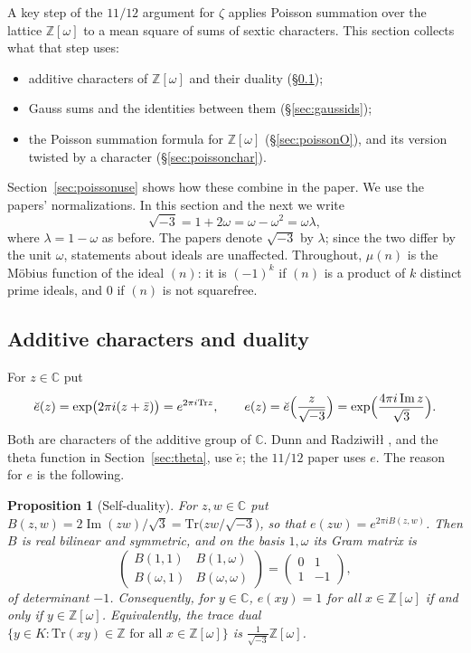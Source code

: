 \documentclass[11pt]{article}
\numberwithin{equation}{section}
\newcommand{\Tr}{\mathrm{Tr}}
\newcommand{\OO}{\mathbb Z[\omega]}
\newcommand{\Z}{\mathbb Z}
\newtheorem{proposition}[theorem]{Proposition}
\theoremstyle{definition}
\theoremstyle{remark}
\begin{document}
A key step of the $11/12$ argument for $\zeta$ \cite{QRH} applies Poisson summation over the lattice $\OO$ to a
mean square of sums of sextic characters. This section collects what that step uses:
\begin{itemize}
\item additive characters of $\OO$ and their duality (\S\ref{sec:addchars});
\item Gauss sums and the identities between them (\S\ref{sec:gaussids});
\item the Poisson summation formula for $\OO$ (\S\ref{sec:poissonO}), and its version twisted by a
character (\S\ref{sec:poissonchar}).
\end{itemize}
Section~\ref{sec:poissonuse} shows how these combine in the paper. We use the papers' normalizations.
In this section and the next we write
\begin{equation}\label{eq:sqrtm3}
 \sqrt{-3}=1+2\omega=\omega-\omega^2=\omega\lambda ,
\end{equation}
where $\lambda=1-\omega$ as before. The papers denote $\sqrt{-3}$ by $\lambda$; since the two differ by
the unit $\omega$, statements about ideals are unaffected. Throughout, $\mu(n)$ is the M\"obius function of
the ideal $(n)$: it is $(-1)^k$ if $(n)$ is a product of $k$ distinct prime ideals, and $0$ if $(n)$ is not squarefree.

\subsection{Additive characters and duality}\label{sec:addchars}
For $z\in\mathbb C$ put
\begin{equation}\label{eq:addchars}
 \breve e(z)=\exp\bigl(2\pi i(z+\bar z)\bigr)=e^{2\pi i\Tr z},\qquad
 e(z)=\breve e\Bigl(\frac z{\sqrt{-3}}\Bigr)=\exp\Bigl(\frac{4\pi i\operatorname{Im}z}{\sqrt3}\Bigr).
\end{equation}
Both are characters of the additive group of $\mathbb C$. Dunn and Radziwi\l\l{} \cite{DR}, and the
theta function in Section~\ref{sec:theta}, use $\breve e$; the $11/12$ paper uses $e$. The reason
for $e$ is the following.

\begin{proposition}[Self-duality]\label{prop:selfdual}
For $z,w\in\mathbb C$ put $B(z,w)=2\operatorname{Im}(zw)/\sqrt3=\Tr\bigl(zw/\sqrt{-3}\bigr)$, so that
$e(zw)=e^{2\pi iB(z,w)}$. Then $B$ is real bilinear and symmetric, and on the basis $1,\omega$ its Gram
matrix is
\begin{equation}\label{eq:gram}
 \begin{pmatrix}B(1,1)&B(1,\omega)\\B(\omega,1)&B(\omega,\omega)\end{pmatrix}
 =\begin{pmatrix}0&1\\1&-1\end{pmatrix},
\end{equation}
of determinant $-1$. Consequently, for $y\in\mathbb C$, $e(xy)=1$ for all $x\in\OO$ if and only if $y\in\OO$.
Equivalently, the trace dual $\{y\in K:\Tr(xy)\in\Z\text{ for all }x\in\OO\}$ is $\frac1{\sqrt{-3}}\OO$.
\end{proposition}
\end{document}
